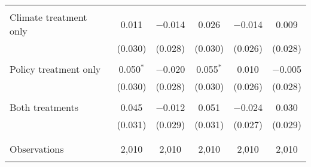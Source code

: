 \begin{tabular}{@{\extracolsep{5pt}}lccccc}
  & & & & & \\ 
 Climate treatment only & 0.011 & $-$0.014 & 0.026 & $-$0.014 & 0.009 \\ 
  & (0.030) & (0.028) & (0.030) & (0.026) & (0.028) \\ 
  & & & & & \\ 
 Policy treatment only & 0.050$^{*}$ & $-$0.020 & 0.055$^{*}$ & 0.010 & $-$0.005 \\ 
  & (0.030) & (0.028) & (0.030) & (0.026) & (0.028) \\ 
  & & & & & \\ 
 Both treatments & 0.045 & $-$0.012 & 0.051 & $-$0.024 & 0.030 \\ 
  & (0.031) & (0.029) & (0.031) & (0.027) & (0.029) \\ 
  & & & & & \\ 
\hline \\[-1.8ex] 

Observations & 2,010 & 2,010 & 2,010 & 2,010 & 2,010 \\ 
\hline 
\hline \\[-1.8ex] 
\end{tabular} 